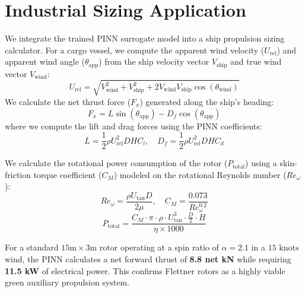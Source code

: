 \documentclass[aip,pof,reprint,onecolumn,amsmath,amssymb,graphicx,longbibliography]{revtex4-2}
\begin{document}
\section{\label{sec:sizing_calculator}Industrial Sizing Application}
We integrate the trained PINN surrogate model into a ship propulsion sizing calculator. For a cargo vessel, we compute the apparent wind velocity ($U_{\text{rel}}$) and apparent wind angle ($\theta_{\text{app}}$) from the ship velocity vector $V_{\text{ship}}$ and true wind vector $V_{\text{wind}}$:
\begin{equation}
U_{\text{rel}} = \sqrt{V_{\text{wind}}^2 + V_{\text{ship}}^2 + 2 V_{\text{wind}} V_{\text{ship}} \cos(\theta_{\text{wind}})}
\end{equation}
We calculate the net thrust force ($F_x$) generated along the ship's heading:
\begin{equation}
F_x = L \sin(\theta_{\text{app}}) - D_f \cos(\theta_{\text{app}})
\end{equation}
where we compute the lift and drag forces using the PINN coefficients:
\begin{equation}
L = \frac{1}{2}\rho U_{\text{rel}}^2 D H C_l, \quad D_f = \frac{1}{2}\rho U_{\text{rel}}^2 D H C_d
\end{equation}

We calculate the rotational power consumption of the rotor ($P_{\text{total}}$) using a skin-friction torque coefficient ($C_M$) modeled on the rotational Reynolds number ($Re_{\omega}$):
\begin{equation}
Re_{\omega} = \frac{\rho U_{\text{tan}} D}{2 \mu}, \quad C_M = \frac{0.073}{Re_{\omega}^{0.2}}
\end{equation}
\begin{equation}
P_{\text{total}} = \frac{C_M \cdot \pi \cdot \rho \cdot U_{\text{tan}}^3 \cdot \frac{D}{2} \cdot H}{\eta \times 1000}
\end{equation}

For a standard $15\text{m} \times 3\text{m}$ rotor operating at a spin ratio of $\alpha = 2.1$ in a $15\text{ knots}$ wind, the PINN calculates a net forward thrust of \textbf{8.8 net kN} while requiring \textbf{11.5 kW} of electrical power. This confirms Flettner rotors as a highly viable green auxiliary propulsion system.
\end{document}
